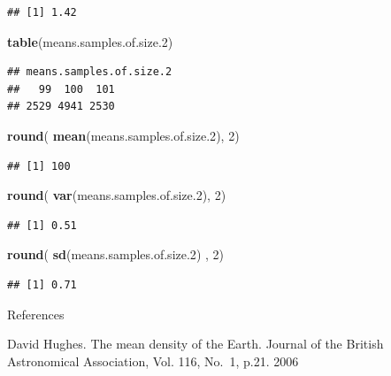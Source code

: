 \documentclass[]{book}
\newenvironment{Shaded}{\begin{snugshade}}{\end{snugshade}}
\newcommand{\DecValTok}[1]{\textcolor[rgb]{0.00,0.00,0.81}{#1}}
\newcommand{\FloatTok}[1]{\textcolor[rgb]{0.00,0.00,0.81}{#1}}
\newcommand{\KeywordTok}[1]{\textcolor[rgb]{0.13,0.29,0.53}{\textbf{#1}}}
\newcommand{\NormalTok}[1]{#1}
\begin{document}
\begin{verbatim}
## [1] 1.42
\end{verbatim}

\begin{Shaded}
\begin{Highlighting}[]
\KeywordTok{table}\NormalTok{(means.samples.of.size}\FloatTok{.2}\NormalTok{)}
\end{Highlighting}
\end{Shaded}

\begin{verbatim}
## means.samples.of.size.2
##   99  100  101 
## 2529 4941 2530
\end{verbatim}

\begin{Shaded}
\begin{Highlighting}[]
\KeywordTok{round}\NormalTok{( }\KeywordTok{mean}\NormalTok{(means.samples.of.size}\FloatTok{.2}\NormalTok{), }\DecValTok{2}\NormalTok{)}
\end{Highlighting}
\end{Shaded}

\begin{verbatim}
## [1] 100
\end{verbatim}

\begin{Shaded}
\begin{Highlighting}[]
\KeywordTok{round}\NormalTok{( }\KeywordTok{var}\NormalTok{(means.samples.of.size}\FloatTok{.2}\NormalTok{), }\DecValTok{2}\NormalTok{)}
\end{Highlighting}
\end{Shaded}

\begin{verbatim}
## [1] 0.51
\end{verbatim}

\begin{Shaded}
\begin{Highlighting}[]
\KeywordTok{round}\NormalTok{( }\KeywordTok{sd}\NormalTok{(means.samples.of.size}\FloatTok{.2}\NormalTok{) , }\DecValTok{2}\NormalTok{)}
\end{Highlighting}
\end{Shaded}

\begin{verbatim}
## [1] 0.71
\end{verbatim}

References

David Hughes. The mean density of the Earth.
Journal of the British Astronomical Association, Vol. 116, No.~1, p.21. 2006
\end{document}

